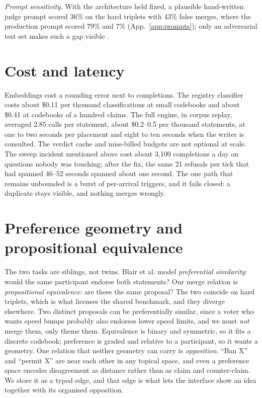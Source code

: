 \documentclass{article}
\newcommand{\bpt}{Blair et al.\xspace}
\begin{document}
\emph{Prompt sensitivity.} With the architecture held fixed, a plausible hand-written judge prompt scored 36\% on the hard triplets with 43\% false merges, where the production prompt scored 79\% and 7\% (App.~\ref{app:prompts}); only an adversarial test set makes such a gap visible \citep{sclar2024quantifying}.


\section{Cost and latency}
\label{app:cost}
Embeddings cost a rounding error next to completions. The registry classifier costs about \$0.11 per thousand classifications at small codebooks and about \$0.41 at codebooks of a hundred claims. The full engine, in corpus replay, averaged 2.85 calls per statement, about \$0.2--0.5 per thousand statements, at one to two seconds per placement and eight to ten seconds when the writer is consulted. The verdict cache and miss-billed budgets are not optional at scale. The sweep incident mentioned above cost about 3{,}100 completions a day on questions nobody was touching; after the fix, the same 21 refusals per tick that had spanned 46--52 seconds spanned about one second. The one path that remains unbounded is a burst of per-arrival triggers, and it fails closed: a duplicate stays visible, and nothing merges wrongly.


\section{Preference geometry and propositional equivalence}
\label{app:bpt}
The two tasks are siblings, not twins. \bpt model \emph{preferential similarity}: would the same participant endorse both statements? Our merge relation is \emph{propositional equivalence}: are these the same proposal? The two coincide on hard triplets, which is what licenses the shared benchmark, and they diverge elsewhere. Two distinct proposals can be preferentially similar, since a voter who wants speed bumps probably also endorses lower speed limits, and we must \emph{not} merge them, only theme them. Equivalence is binary and symmetric, so it fits a discrete codebook; preference is graded and relative to a participant, so it wants a geometry. One relation that neither geometry can carry is \emph{opposition}. ``Ban X'' and ``permit X'' are near each other in any topical space, and even a preference space encodes disagreement as distance rather than as claim and counter-claim. We store it as a typed edge, and that edge is what lets the interface show an idea together with its organised opposition.
\end{document}

